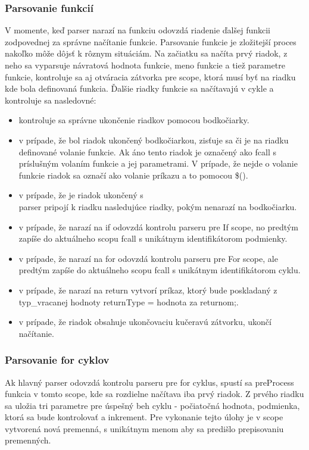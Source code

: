 \subsubsection{Parsovanie funkcií}
\indent V momente, keď parser narazí na funkciu odovzdá riadenie ďalšej funkcii zodpovednej za správne načítanie funkcie. Parsovanie funkcie je zložitejší proces nakoľko môže dôjsť k rôznym situáciám. Na začiatku sa načíta prvý riadok, z neho sa vyparsuje návratová hodnota funkcie, meno funkcie a tiež parametre funkcie, kontroluje sa aj otváracia zátvorka pre scope, ktorá musí byť na riadku kde bola definovaná funkcia. Ďalšie riadky funkcie sa načítavajú v cykle a kontroluje sa nasledovné: 
\begin{itemize}	
	\item kontroluje sa správne ukončenie riadkov pomocou bodkočiarky.
	\item v prípade, že bol riadok ukončený bodkočiarkou, zisťuje sa či je na riadku definované volanie funkcie. Ak áno tento riadok je označený ako fcall s príslušným volaním funkcie a jej parametrami. V prípade, že nejde o volanie funkcie riadok sa označí ako volanie príkazu a to pomocou \$().
	\item v prípade, že je riadok ukončený s \\ parser pripojí k riadku nasledujúce riadky, pokým nenarazí na bodkočiarku.
	\item v prípade, že narazí na if odovzdá kontrolu parseru pre If scope, no predtým zapíše do aktuálneho scopu fcall s unikátnym identifikátorom podmienky.
	\item v prípade, že narazí na for odovzdá kontrolu parseru pre For scope, ale predtým zapíše do aktuálneho scopu fcall s unikátnym identifikátorom cyklu.
	\item v prípade, že narazí na return vytvorí príkaz, ktorý bude poskladaný z typ\_vracanej hodnoty returnType = hodnota za returnom;.
	\item  v prípade, že riadok obsahuje ukončovaciu kučeravú zátvorku, ukončí načítanie.
\end{itemize} 
\subsubsection{Parsovanie for cyklov}
\indent Ak hlavný parser odovzdá kontrolu parseru pre for cyklus, spustí sa preProcess funkcia v tomto scope, kde sa rozdielne načítava iba prvý riadok.
Z prvého riadku sa uložia tri parametre pre úspešný beh cyklu - počiatočná hodnota, podmienka, ktorá sa bude kontrolovať a inkrement. Pre vykonanie tejto úlohy je v scope vytvorená nová premenná, s unikátnym menom aby sa predišlo prepisovaniu premenných.
